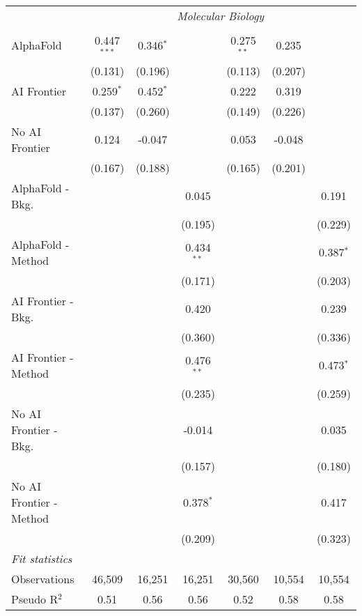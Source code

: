 \begin{tabular}{lcccccc}
 & \multicolumn{6}{c}{\textit{Molecular Biology}} \\ \\
   AlphaFold               & 0.447$^{***}$ & 0.346$^{*}$ &              & 0.275$^{**}$ & 0.235   &   \\   
                           & (0.131)       & (0.196)     &              & (0.113)      & (0.207) &   \\   
   AI Frontier             & 0.259$^{*}$   & 0.452$^{*}$ &              & 0.222        & 0.319   &   \\   
                           & (0.137)       & (0.260)     &              & (0.149)      & (0.226) &   \\   
   No AI Frontier          & 0.124         & -0.047      &              & 0.053        & -0.048  &   \\   
                           & (0.167)       & (0.188)     &              & (0.165)      & (0.201) &   \\   
   AlphaFold - Bkg.        &               &             & 0.045        &              &         & 0.191\\   
                           &               &             & (0.195)      &              &         & (0.229)\\   
   AlphaFold - Method      &               &             & 0.434$^{**}$ &              &         & 0.387$^{*}$\\   
                           &               &             & (0.171)      &              &         & (0.203)\\   
   AI Frontier - Bkg.      &               &             & 0.420        &              &         & 0.239\\   
                           &               &             & (0.360)      &              &         & (0.336)\\   
   AI Frontier - Method    &               &             & 0.476$^{**}$ &              &         & 0.473$^{*}$\\   
                           &               &             & (0.235)      &              &         & (0.259)\\   
   No AI Frontier - Bkg.   &               &             & -0.014       &              &         & 0.035\\   
                           &               &             & (0.157)      &              &         & (0.180)\\   
   No AI Frontier - Method &               &             & 0.378$^{*}$  &              &         & 0.417\\   
                           &               &             & (0.209)      &              &         & (0.323)\\   
   \midrule
   \emph{Fit statistics}\\
   Observations            & 46,509        & 16,251      & 16,251       & 30,560       & 10,554  & 10,554\\  
   Pseudo R$^2$            & 0.51          & 0.56        & 0.56         & 0.52         & 0.58    & 0.58\\  
   

\end{tabular}
